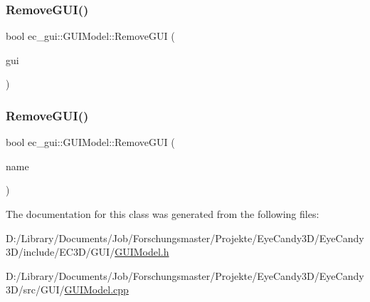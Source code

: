 \subsubsection{\texorpdfstring{Remove\+G\+U\+I()}{RemoveGUI()}\hspace{0.1cm}{\footnotesize\ttfamily [1/2]}}
{\footnotesize\ttfamily bool ec\+\_\+gui\+::\+G\+U\+I\+Model\+::\+Remove\+G\+UI (\begin{DoxyParamCaption}\item[{\mbox{\hyperlink{classec__gui_1_1_g_u_i}{G\+UI}} $\ast$}]{gui }\end{DoxyParamCaption})}

\mbox{\label{classec__gui_1_1_g_u_i_model_adf602f611086903260ae863b76a164f7}} 
\subsubsection{\texorpdfstring{Remove\+G\+U\+I()}{RemoveGUI()}\hspace{0.1cm}{\footnotesize\ttfamily [2/2]}}
{\footnotesize\ttfamily bool ec\+\_\+gui\+::\+G\+U\+I\+Model\+::\+Remove\+G\+UI (\begin{DoxyParamCaption}\item[{const std\+::string \&}]{name }\end{DoxyParamCaption})}



The documentation for this class was generated from the following files\+:\begin{DoxyCompactItemize}
\item 
D\+:/\+Library/\+Documents/\+Job/\+Forschungsmaster/\+Projekte/\+Eye\+Candy3\+D/\+Eye\+Candy3\+D/include/\+E\+C3\+D/\+G\+U\+I/\mbox{\hyperlink{_g_u_i_model_8h}{G\+U\+I\+Model.\+h}}\item 
D\+:/\+Library/\+Documents/\+Job/\+Forschungsmaster/\+Projekte/\+Eye\+Candy3\+D/\+Eye\+Candy3\+D/src/\+G\+U\+I/\mbox{\hyperlink{_g_u_i_model_8cpp}{G\+U\+I\+Model.\+cpp}}\end{DoxyCompactItemize}
